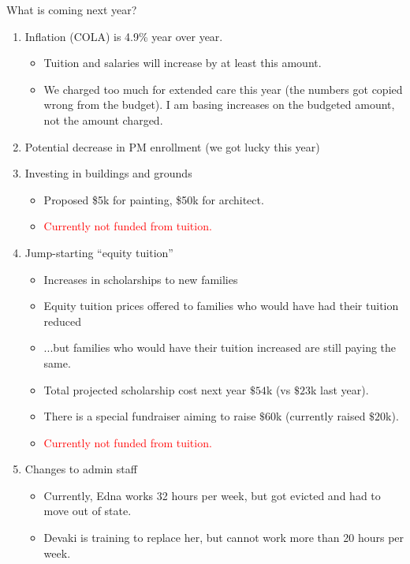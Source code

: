 \documentclass[8pt]{beamer}
\begin{document}
\begin{frame}{What is coming next year?}

%
\begin{enumerate}
%
\item Inflation (COLA) is 4.9\% year over year.
%
    \begin{itemize}
    \item Tuition and salaries will increase by at least this amount.
    \item We charged too much for extended care this year
    (the numbers got copied wrong from the budget).  I am basing increases
    on the budgeted amount, not the amount charged.
    \end{itemize}
%
\pause
\item Potential decrease in PM enrollment (we got lucky this year)
\pause
\item Investing in buildings and grounds
%
    \begin{itemize}
    \item Proposed \$5k for painting, \$50k for architect.
    \item \textcolor{red}{Currently not funded from tuition.}
    \end{itemize}
%
\pause
\item Jump-starting ``equity tuition''
    \begin{itemize}
    \item Increases in scholarships to new families
    \item Equity tuition prices offered to families who would have had their
    tuition reduced
    \item ...but families who would have their tuition increased are still paying
    the same.
    \item Total projected scholarship cost next year $\$54$k (vs $\$23$k last year).
    \item There is a special fundraiser aiming to raise $\$60$k (currently
    raised $\$20$k).
    \item \textcolor{red}{Currently not funded from tuition.}
    \end{itemize}
%
\pause
\item Changes to admin staff
    \begin{itemize}
        \item Currently, Edna works 32 hours per week, but got evicted and had to move out of state.
        \item Devaki is training to replace her, but cannot work more than 20 hours per week.

\end{itemize}
\end{enumerate}
\end{frame}
\end{document}
